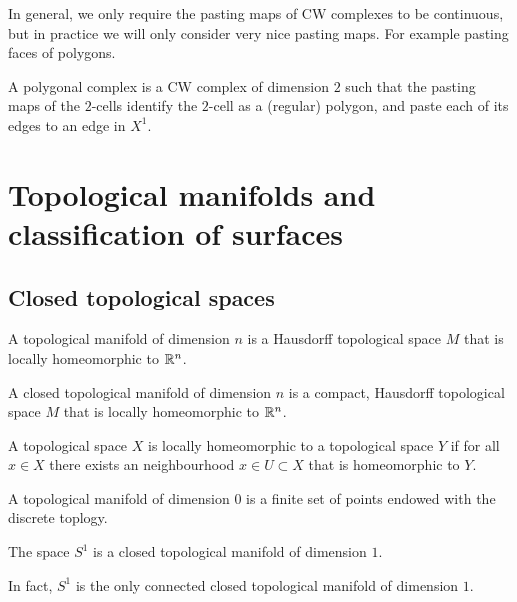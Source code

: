 \documentclass[11pt,a4paper]{article}
\begin{document}
In general, we only require the pasting maps of CW complexes to be continuous,
but in practice we will only consider very nice pasting maps.
For example pasting faces of polygons.

\begin{definition}
  A polygonal complex is a CW complex of dimension $2$ such that the pasting
  maps of the $2$-cells identify the $2$-cell as a (regular) polygon,
  and paste each of its edges to an edge in $X^1$.
\end{definition}

\section{Topological manifolds and classification of surfaces}

\subsection{Closed topological spaces}
\begin{definition}
  A topological manifold of dimension $n$ is a Hausdorff
  topological space $M$ that is locally homeomorphic to $\mathbb{R}^n$.
\end{definition}

\begin{definition}
  A closed topological manifold of dimension $n$ is a compact, Hausdorff
  topological space $M$ that is locally homeomorphic to $\mathbb{R}^n$.
\end{definition}
\begin{remark}
  A topological space $X$ is locally homeomorphic to a topological space
  $Y$ if for all $x \in X$ there exists an neighbourhood $x \in U \subset X$
  that is homeomorphic to $Y$.
\end{remark}

\begin{example}
  A topological manifold of dimension $0$ is a finite set of points endowed
  with the discrete toplogy.
\end{example}

\begin{example}
  The space $S^1$ is a closed topological manifold of dimension $1$.
\end{example}
\begin{remark}
  In fact, $S^1$ is the only connected closed topological manifold
  of dimension $1$.
\end{remark}
\end{document}
